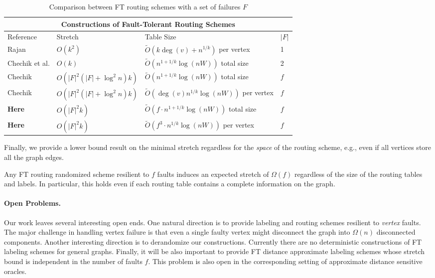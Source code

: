 \begin{table}[h!]
\centering
\begin{tabular}{ |p{4.2cm}|p{4cm}|p{6cm}|p{0.5cm}|}
 \hline	
 \multicolumn{4}{|c|}{Constructions of Fault-Tolerant Routing Schemes}\\
 \hline
  Reference & Stretch & Table Size & $|F|$ \\
 \hline
  Rajan \cite{rajan2012space} & $O(k^2)$ & $\widetilde{O}(k \deg(v)+ n^{1/k})$ per vertex & 1\\
  Chechik et al. \cite{chechik2012f} & $O(k)$ & $\widetilde{O}(n^{1+1/k} \log(nW))$ total size & 2\\
  Chechik \cite{chechik2011fault}  & $O(|F|^2(|F|+\log^2 n)k)$ & $\widetilde{O}(n^{1+1/k} \log(nW))$ total size & $f$\\
  Chechik \cite{chechik2011fault}  & $O(|F|^2(|F|+\log^2 n)k)$ & $\widetilde{O}(\deg(v)n^{1/k} \log(nW))$ per vertex & $f$\\
  \textbf{Here} & $O(|F|^2 k)$ & $\widetilde{O}(f \cdot n^{1+1/k} \log(nW))$ total size & $f$\\
  \textbf{Here} & $O(|F|^2 k)$ & $\widetilde{O}(f^3 \cdot n^{1/k} \log(nW))$ per vertex & $f$\\
 \hline
 \end{tabular}
 \caption{Comparison between FT routing schemes with a set of failures $F$}
\label{table_routing}
\end{table}

Finally, we provide a lower bound result on the minimal stretch regardless for the \emph{space} of the routing scheme, e.g., even if all vertices store all the graph edges. 

\begin{theorem}\label{thm:lb-routing}
Any FT routing randomized scheme resilient to $f$ faults induces an expected stretch of $\Omega(f)$ regardless of the size of the routing tables and labels. In particular, this holds even if each routing table contains a complete information on the graph. 
\end{theorem}


\paragraph{Open Problems.} Our work leaves several interesting open ends. One natural direction is to provide labeling and routing schemes resilient to \emph{vertex} faults. The major challenge in handling vertex failure is that even a single faulty vertex might disconnect the graph into $\Omega(n)$ disconnected components. Another interesting direction is to derandomize our constructions. Currently there are no deterministic constructions of FT labeling schemes for general graphs. Finally, it will be also important to provide FT distance approximate labeling schemes whose stretch bound is independent in the number of faults $f$. This problem is also open in the corresponding setting of approximate distance sensitive oracles. 
